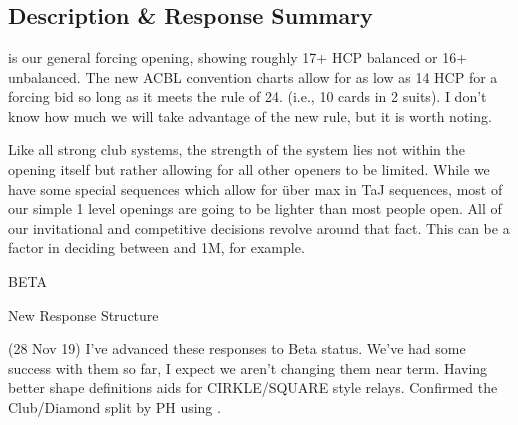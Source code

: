 \documentclass[tom-ari]{subfile}
\begin{document}
	
	\chapter[1C]{}
		
	\section{Description \& Response Summary}
	
	 is our general forcing opening, showing roughly 17+ HCP balanced or 16+ unbalanced.  The new ACBL convention charts allow for as low as 14 HCP for a forcing bid so long as it meets the rule of 24.  (i.e., 10 cards in 2 suits).  I don't know how much we will take advantage of the new rule, but it is worth noting.
	
	Like all strong club systems, the strength of the system lies not within the  opening itself but rather allowing for all other openers to be limited.  While we have some special sequences which allow for \"{u}ber max in TaJ sequences, most of our simple 1 level openings are going to be lighter than most people open.  All of our invitational and competitive decisions revolve around that fact.  This can be a factor in deciding between  and 1M, for example.
		
	\Huge{\color{red}BETA}
		
	New Response Structure
	
	\normalsize
	
	(28 Nov 19) I've advanced these responses to Beta status. We've had some success with them so far, I expect we aren't changing them near term. Having better shape definitions aids for CIRKLE/SQUARE style relays.  Confirmed the Club/Diamond split by PH using .
	
\end{document}
